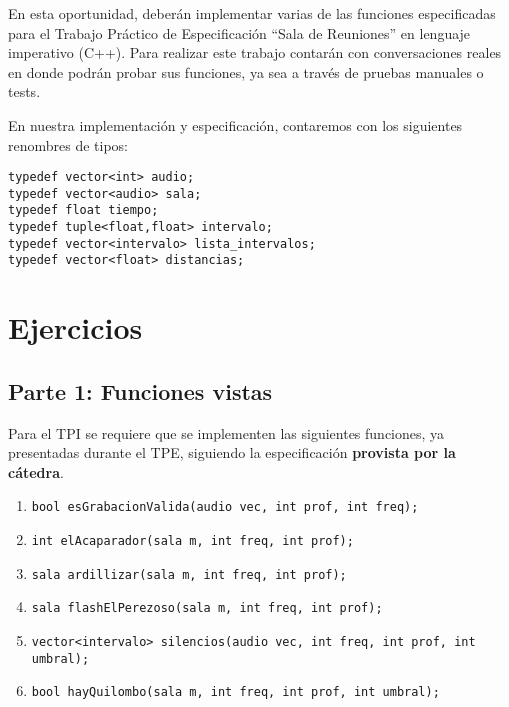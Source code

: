 \documentclass[a4paper]{article}
\newcounter{saveenumi}
\newcommand{\seti}{\setcounter{saveenumi}{\value{enumi}}}
\begin{document}



\titulotp


En esta oportunidad, deberán implementar varias de las funciones especificadas para el Trabajo Práctico de Especificación ``Sala de Reuniones'' en lenguaje imperativo (C++). Para realizar este trabajo contarán con conversaciones reales en donde podrán probar sus funciones, ya sea a través de pruebas manuales o tests.

En nuestra implementación y especificación, contaremos con los siguientes renombres de tipos:

\begin{lstlisting}
typedef vector<int> audio;
typedef vector<audio> sala;
typedef float tiempo;
typedef tuple<float,float> intervalo;
typedef vector<intervalo> lista_intervalos;
typedef vector<float> distancias;
\end{lstlisting}


\section{Ejercicios}

\subsection{Parte 1: Funciones vistas}

Para el TPI se requiere que se implementen las siguientes funciones, ya presentadas durante el TPE, siguiendo la especificación \textbf{provista por la cátedra}.

\begin{enumerate}
\item
\lstinline{bool esGrabacionValida(audio vec, int prof, int freq);}
\item
\lstinline{int elAcaparador(sala m, int freq, int prof);}

\item
\lstinline{sala ardillizar(sala m, int freq, int prof);}

\item \lstinline{sala flashElPerezoso(sala m, int freq, int prof);}

\item \lstinline{vector<intervalo> silencios(audio vec, int freq, int prof, int umbral);}

\item \lstinline{bool hayQuilombo(sala m, int freq, int prof, int umbral);}
    \seti

\end{enumerate}
\end{document}
